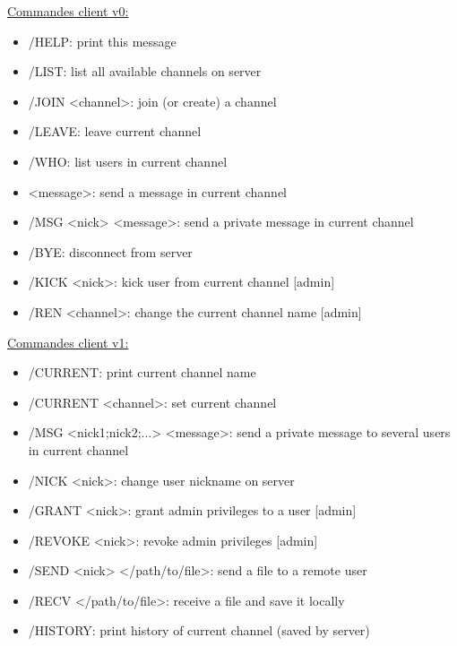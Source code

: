 \documentclass[12pt]{article}
\begin{document}
{{\underline{Commandes client v0:}}
\begin{itemize}
    \item /HELP: print this message
    \item /LIST: list all available channels on server
    \item /JOIN <channel>: join (or create) a channel
    \item /LEAVE: leave current channel
    \item /WHO: list users in current channel
    \item <message>: send a message in current channel
    \item /MSG <nick> <message>: send a private message in current channel
    \item /BYE: disconnect from server
    \item /KICK <nick>: kick user from current channel [admin]
    \item /REN <channel>: change the current channel name [admin]
\end{itemize}

{{\underline{Commandes client v1:}}
\begin{itemize}
    \item /CURRENT: print current channel name
\item /CURRENT <channel>: set current channel
\item /MSG <nick1;nick2;...> <message>: send a private message to several users in current channel
\item /NICK <nick>: change user nickname on server
\item /GRANT <nick>: grant admin privileges to a user [admin]
\item /REVOKE <nick>: revoke admin privileges [admin]
\item /SEND <nick> </path/to/file>: send a file to a remote user
\item /RECV </path/to/file>: receive a file and save it locally
\item /HISTORY: print history of current channel (saved by server)
\\
\end{itemize}

}}
\end{document}
